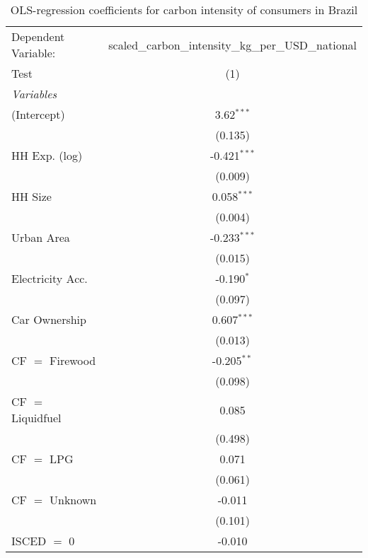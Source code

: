 
\begin{table}[htbp!]
   \centering
   \small
   \begin{adjustbox}{width = 1\textwidth, max height = 0.95\textheight, center}
      \begin{threeparttable}[b]
         \caption{\label{tab:OLS_1_BRA} OLS-regression coefficients for carbon intensity of consumers in Brazil}
         \begin{tabular}{lc}
            \tabularnewline \midrule \midrule
            Dependent Variable: & scaled\_carbon\_intensity\_kg\_per\_USD\_national\\        
            Test                & (1)\\  
            \midrule
            \emph{Variables}\\
            (Intercept)         & 3.62$^{***}$\\   
                                & (0.135)\\   
            HH Exp. (log)       & -0.421$^{***}$\\   
                                & (0.009)\\   
            HH Size             & 0.058$^{***}$\\   
                                & (0.004)\\   
            Urban Area          & -0.233$^{***}$\\   
                                & (0.015)\\   
            Electricity Acc.    & -0.190$^{*}$\\   
                                & (0.097)\\   
            Car Ownership       & 0.607$^{***}$\\   
                                & (0.013)\\   
            CF $=$ Firewood     & -0.205$^{**}$\\   
                                & (0.098)\\   
            CF $=$ Liquidfuel   & 0.085\\   
                                & (0.498)\\   
            CF $=$ LPG          & 0.071\\   
                                & (0.061)\\   
            CF $=$ Unknown      & -0.011\\   
                                & (0.101)\\   
            ISCED $=$ 0         & -0.010\\   

\end{tabular}
\end{threeparttable}
\end{adjustbox}
\end{table}
